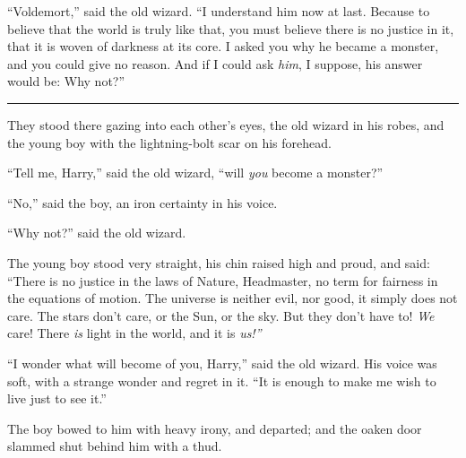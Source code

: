 ``Voldemort,'' said the old wizard. ``I understand him now at last.
Because to believe that the world is truly like that, you must believe
there is no justice in it, that it is woven of darkness at its core. I
asked you why he became a monster, and you could give no reason. And if
I could ask \emph{him}, I suppose, his answer would be: Why not?''

\begin{center}\rule{3in}{0.4pt}\end{center}

They stood there gazing into each other's eyes, the old wizard in his
robes, and the young boy with the lightning-bolt scar on his forehead.

``Tell me, Harry,'' said the old wizard, ``will \emph{you} become a
monster?''

``No,'' said the boy, an iron certainty in his voice.

``Why not?'' said the old wizard.

The young boy stood very straight, his chin raised high and proud, and
said: ``There is no justice in the laws of Nature, Headmaster, no term
for fairness in the equations of motion. The universe is neither evil,
nor good, it simply does not care. The stars don't care, or the Sun, or
the sky. But they don't have to! \emph{We} care! There \emph{is} light
in the world, and it is \emph{us!''}

``I wonder what will become of you, Harry,'' said the old wizard. His
voice was soft, with a strange wonder and regret in it. ``It is enough
to make me wish to live just to see it.''

The boy bowed to him with heavy irony, and departed; and the oaken door
slammed shut behind him with a thud.
